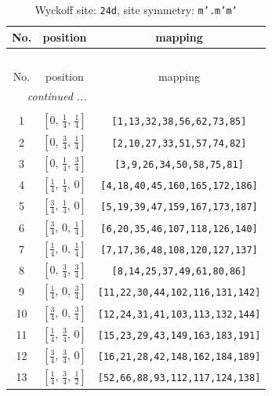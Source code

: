 \documentclass[fleqn,8pt]{jsarticle}
\begin{document}
\begin{longtable}{ccc}
\caption{Wyckoff site: {\tt 24d}, site symmetry: {\tt m'.m'm'}}
 \\
 \hline \hline
No. & position & mapping \\ \hline \endfirsthead

\multicolumn{2}{l}{\tablename\ \thetable{}} \\
 \hline \hline
No. & position & mapping \\ \hline \endhead

 \hline \hline
\multicolumn{2}{r}{\footnotesize\it continued ...} \\ \endfoot

 \hline \hline
\multicolumn{2}{r}{} \\ \endlastfoot

1 & $\left[ 0,\, \frac{1}{4},\, \frac{1}{4} \right]$ & {\tt [1,13,32,38,56,62,73,85]} \\ \hline
2 & $\left[ 0,\, \frac{3}{4},\, \frac{1}{4} \right]$ & {\tt [2,10,27,33,51,57,74,82]} \\ \hline
3 & $\left[ 0,\, \frac{1}{4},\, \frac{3}{4} \right]$ & {\tt [3,9,26,34,50,58,75,81]} \\ \hline
4 & $\left[ \frac{1}{4},\, \frac{1}{4},\, 0 \right]$ & {\tt [4,18,40,45,160,165,172,186]} \\ \hline
5 & $\left[ \frac{3}{4},\, \frac{1}{4},\, 0 \right]$ & {\tt [5,19,39,47,159,167,173,187]} \\ \hline
6 & $\left[ \frac{3}{4},\, 0,\, \frac{1}{4} \right]$ & {\tt [6,20,35,46,107,118,126,140]} \\ \hline
7 & $\left[ \frac{1}{4},\, 0,\, \frac{1}{4} \right]$ & {\tt [7,17,36,48,108,120,127,137]} \\ \hline
8 & $\left[ 0,\, \frac{3}{4},\, \frac{3}{4} \right]$ & {\tt [8,14,25,37,49,61,80,86]} \\ \hline
9 & $\left[ \frac{1}{4},\, 0,\, \frac{3}{4} \right]$ & {\tt [11,22,30,44,102,116,131,142]} \\ \hline
10 & $\left[ \frac{3}{4},\, 0,\, \frac{3}{4} \right]$ & {\tt [12,24,31,41,103,113,132,144]} \\ \hline
11 & $\left[ \frac{1}{4},\, \frac{3}{4},\, 0 \right]$ & {\tt [15,23,29,43,149,163,183,191]} \\ \hline
12 & $\left[ \frac{3}{4},\, \frac{3}{4},\, 0 \right]$ & {\tt [16,21,28,42,148,162,184,189]} \\ \hline
13 & $\left[ \frac{1}{4},\, \frac{3}{4},\, \frac{1}{2} \right]$ & {\tt [52,66,88,93,112,117,124,138]} \\ \hline

\end{longtable}
\end{document}
